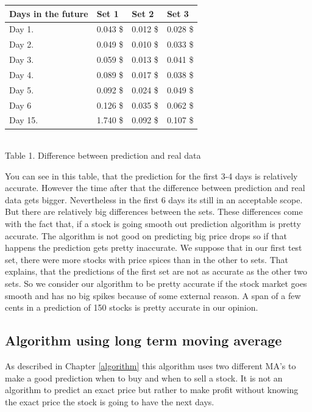 \documentclass[conference]{IEEEtran}
\begin{document}
\begin{center}
\begin{tabularx}{0.49\textwidth}{|X|X|X|X|}
\hline
Days in the future & Set 1 & Set 2 & Set 3\\
\hline
\hline
Day 1. & 0.043 \$ & 0.012 \$ & 0.028 \$\\
\hline
Day 2. & 0.049 \$ & 0.010 \$ & 0.033 \$\\
\hline
Day 3. & 0.059 \$ & 0.013 \$ & 0.041 \$\\
\hline
Day 4. & 0.089 \$ & 0.017 \$ & 0.038 \$\\
\hline
Day 5. & 0.092 \$ & 0.024 \$ & 0.049 \$\\
\hline
Day 6 & 0.126 \$ & 0.035 \$ & 0.062 \$\\
\hline
\hline
Day 15. & 1.740 \$ & 0.092 \$ & 0.107 \$\\
\hline

\end{tabularx}
\\[5pt]
Table 1. Difference between prediction and real data
\end{center}

You can see in this table, that the prediction for the first 3-4 days is relatively accurate. However the time after that the difference between prediction and real data gets bigger. Nevertheless in the first 6 days its still in an acceptable scope. But there are relatively big differences between the sets. These differences come with the fact that, if a stock is going smooth out prediction algorithm is pretty accurate. The algorithm is not good on predicting big price drops so if that happens the prediction gets pretty inaccurate. We suppose that in our first test set, there were more stocks with price spices than in the other to sets. That explains, that the predictions of the first set are not as accurate as the other two sets. So we consider our algorithm to be pretty accurate if the stock market goes smooth and has no big spikes because of some external reason. A span of a few cents in a prediction of 150 stocks is pretty accurate in our opinion.

\subsection{Algorithm using long term moving average}

As described in Chapter \ref{algorithm} this algorithm uses two different MA's to make a good prediction when to buy and when to sell a stock. It is not an algorithm to predict an exact price but rather to make profit without knowing the exact price the stock is going to have the next days.
\end{document}
